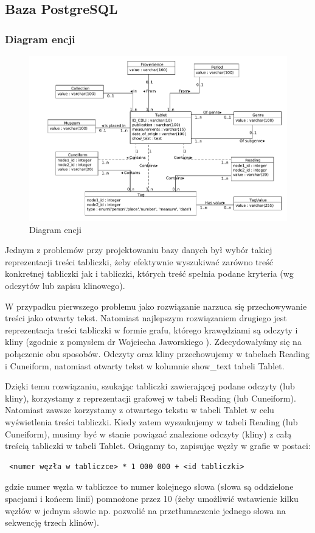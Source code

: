 \subsection{Baza PostgreSQL}
\subsubsection{Diagram encji}
\begin{figure}[h]
 \centering
 \includegraphics[width=500px]{../diagramy/diagram-encji-maly.pdf}
 \caption{Diagram encji}
\end{figure}
Jednym z problemów przy projektowaniu bazy danych był wybór takiej reprezentacji treści tabliczki, 
żeby efektywnie wyszukiwać zarówno treść konkretnej tabliczki jak i tabliczki, których treść spełnia podane kryteria
 (wg odczytów lub zapisu klinowego).

W przypadku pierwszego problemu jako rozwiązanie narzuca się przechowywanie treści
jako otwarty tekst.
Natomiast najlepszym rozwiązaniem drugiego jest reprezentacja treści tabliczki
w formie grafu, którego krawędziami są odczyty i kliny (zgodnie z pomysłem dr Wojciecha Jaworskiego \cite[s.374]{jaworski}).
Zdecydowałyśmy się na połączenie obu sposobów. Odczyty oraz kliny przechowujemy w tabelach Reading i Cuneiform, 
natomiast otwarty tekst w kolumnie show\_text tabeli Tablet. 

Dzięki temu rozwiązaniu, szukając tabliczki zawierającej podane odczyty (lub kliny), korzystamy z reprezentacji
grafowej w tabeli Reading (lub Cuneiform).
Natomiast zawsze korzystamy z otwartego tekstu w tabeli Tablet w celu wyświetlenia treści tabliczki.
Kiedy zatem wyszukujemy w tabeli Reading (lub Cuneiform), musimy być w stanie powiązać znalezione odczyty (kliny) 
z całą treścią tabliczki w tabeli Tablet. Osiągamy to, zapisując węzły w grafie w postaci:
\begin{verbatim}
 <numer węzła w tabliczce> * 1 000 000 + <id tabliczki>
\end{verbatim}
gdzie numer węzła w tabliczce to numer kolejnego słowa (słowa są oddzielone spacjami i końcem linii) pomnożone przez 10 
(żeby umożliwić wstawienie kilku węzłów w jednym słowie np. pozwolić na przetłumaczenie jednego słowa na sekwencję trzech klinów). 


